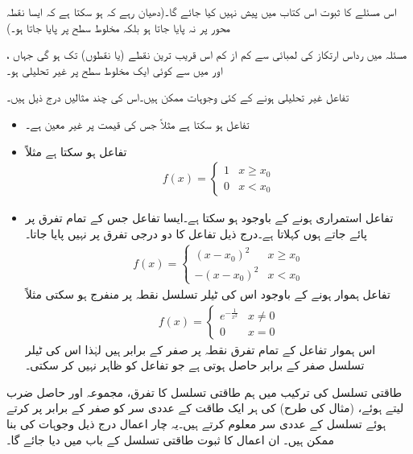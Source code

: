اس مسئلے کا ثبوت اس کتاب میں پیش نہیں کیا جائے گا۔(دھیان رہے کہ ہو سکتا ہے کہ ایسا نقطہ  محور پر نہ پایا جاتا ہو بلکہ مخلوط سطح پر پایا جاتا ہو۔)

مسئلہ  میں  رداس ارتکاز  کی لمبائی  سے کم از کم اس قریب ترین نقطے (یا نقطوں) تک ہو گی جہاں  ،  اور   میں سے کوئی ایک مخلوط سطح پر غیر تحلیلی ہو۔

تفاعل غیر تحلیلی ہونے کے کئی وجوہات ممکن ہیں۔اس کی چند مثالیں درج ذیل ہیں۔
\begin{itemize}
\item
تفاعل  ہو سکتا ہے مثلاً  جس کی قیمت  پر غیر معین ہے۔
\item
تفاعل  ہو سکتا ہے مثلاً 
\begin{align*}
f(x)=
\begin{cases}
1&x\ge x_0\\
0& x<x_0
\end{cases}
\end{align*}
%
\item
تفاعل استمراری ہونے کے باوجود  ہو سکتا ہے۔ایسا تفاعل جس کے تمام تفرق  پر پائے جاتے ہوں  کہلاتا ہے۔درج ذیل تفاعل کا دو درجی تفرق  پر نہیں پایا جاتا۔
\begin{align*}
f(x)=
\begin{cases}
(x-x_0)^2&x\ge x_0\\
-(x-x_0)^2& x<x_0
\end{cases}
\end{align*}
%
تفاعل ہموار ہونے کے باوجود اس کی ٹیلر تسلسل نقطہ  پر منفرج  ہو سکتی مثلاً
\begin{align*}
f(x)=
\begin{cases}
e^{-\frac{1}{x^2}}&x\ne 0\\
0& x=0
\end{cases}
\end{align*}
اس ہموار تفاعل کے تمام تفرق نقطہ  پر صفر کے برابر ہیں لہٰذا  اس کی ٹیلر تسلسل صفر کے برابر حاصل ہوتی ہے جو تفاعل کو ظاہر نہیں کر سکتی۔ 
%
\end{itemize}

طاقتی تسلسل کی ترکیب میں ہم طاقتی تسلسل کا تفرق، مجموعہ اور  حاصل ضرب لیتے ہوئے، (مثال  کی طرح)  کی ہر ایک طاقت کے عددی سر کو صفر کے برابر پر کرتے ہوئے تسلسل  کے عددی سر معلوم کرتے ہیں۔یہ چار اعمال درج ذیل وجوہات کی بنا ممکن ہیں۔ ان اعمال کا ثبوت طاقتی تسلسل کے باب میں دیا جائے گا۔

